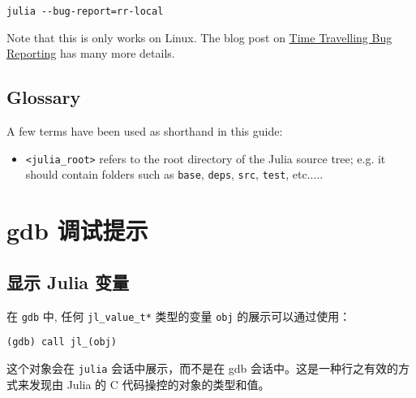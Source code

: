 \begin{verbatim}
julia --bug-report=rr-local
\end{verbatim}



Note that this is only works on Linux. The blog post on \href{https://julialang.org/blog/2020/05/rr/}{Time Travelling Bug Reporting} has many more details.



\hypertarget{15861385441225766089}{}


\subsection{Glossary}



A few terms have been used as shorthand in this guide:



\begin{itemize}
\item \texttt{<julia\_root>} refers to the root directory of the Julia source tree; e.g. it should contain folders such as \texttt{base}, \texttt{deps}, \texttt{src}, \texttt{test}, etc.....

\end{itemize}


\hypertarget{9756537906535455458}{}


\section{gdb 调试提示}



\hypertarget{12713077053871939955}{}


\subsection{显示 Julia 变量}



在 \texttt{gdb} 中, 任何 \texttt{jl\_value\_t*} 类型的变量 \texttt{obj} 的展示可以通过使用：




\begin{lstlisting}
(gdb) call jl_(obj)
\end{lstlisting}



这个对象会在 \texttt{julia} 会话中展示，而不是在 gdb 会话中。这是一种行之有效的方式来发现由 Julia 的 C 代码操控的对象的类型和值。




